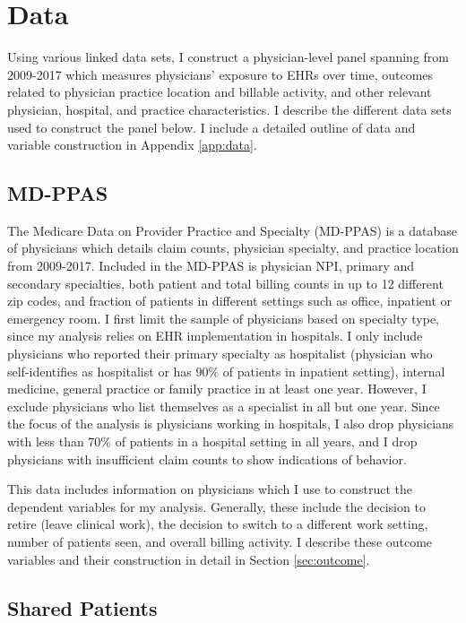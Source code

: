 \documentclass[12pt]{article}
\begin{document}
\section{Data}

Using various linked data sets, I construct a physician-level panel spanning from 2009-2017 which measures physicians' exposure to EHRs over time, outcomes related to physician practice location and billable activity, and other relevant physician, hospital, and practice characteristics. I describe the different data sets used to construct the panel below. I include a detailed outline of data and variable construction in Appendix \ref{app:data}.

\subsection{MD-PPAS}

The Medicare Data on Provider Practice and Specialty (MD-PPAS) is a database of physicians which details claim counts, physician specialty, and practice location from 2009-2017. Included in the MD-PPAS is physician NPI, primary and secondary specialties, both patient and total billing counts in up to 12 different zip codes, and fraction of patients in different settings such as office, inpatient or emergency room. I first limit the sample of physicians based on specialty type, since my analysis relies on EHR implementation in hospitals. I only include physicians who reported their primary specialty as hospitalist (physician who self-identifies as hospitalist or has 90\% of patients in inpatient setting), internal medicine, general practice or family practice in at least one year. However, I exclude physicians who list themselves as a specialist in all but one year. Since the focus of the analysis is physicians working in hospitals, I also drop physicians with less than 70\% of patients in a hospital setting in all years, and I drop physicians with insufficient claim counts to show indications of behavior.

This data includes information on physicians which I use to construct the dependent variables for my analysis. Generally, these include the decision to retire (leave clinical work), the decision to switch to a different work setting, number of patients seen, and overall billing activity. I describe these outcome variables and their construction in detail in Section \ref{sec:outcome}.


\subsection{Shared Patients}
\end{document}
